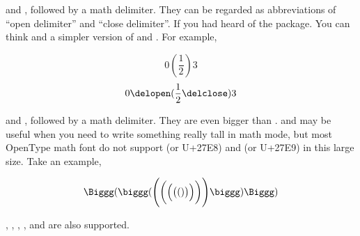 \documentclass[11pt,letterpaper]{article}
\begin{document}
 and , followed by a math delimiter. They can be
regarded as abbreviations of ``open delimiter'' and ``close delimiter''. If
you had heard of the  package. You can think 
and  a simpler version of  and . For example,
\begin{example}
\[    0 \left(\frac12\right) 3    \]
\[ 0 \delopen(\frac12\delclose) 3 \]
\end{example}

 and , followed by a math delimiter. They are even bigger
than .  and  may be useful when you need to write
something really tall in math mode, but most OpenType math font do not support
 (or U+27E8) and  (or U+27E9) in this large size. Take
an example,
\begin{example}
\[\Biggg(\biggg(\Bigg(\bigg(\Big(\big((
)\big)\Big)\bigg)\Bigg)\biggg)\Biggg)\]
\end{example}
, , , ,  and 
are also supported.
\end{document}
